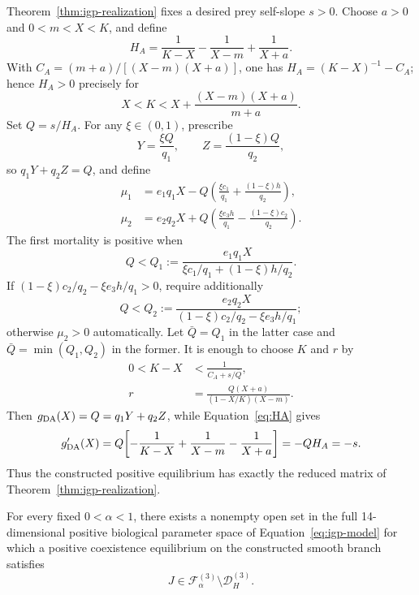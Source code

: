 Theorem~\ref{thm:igp-realization} fixes a desired prey self-slope \(s>0\). Choose \(a>0\) and \(0<m<X<K\), and define
\begin{equation}
 H_A
 =
 \frac{1}{K-X}-\frac{1}{X-m}+\frac{1}{X+a}.
 \label{eq:HA}
\end{equation}
With \(C_A=(m+a)/[(X-m)(X+a)]\), one has \(H_A=(K-X)^{-1}-C_A\); hence \(H_A>0\) precisely for
\[
 X<K<X+\frac{(X-m)(X+a)}{m+a}.
\]
Set \(Q=s/H_A\). For any \(\xi\in(0,1)\), prescribe
\[
 Y=\frac{\xi Q}{q_1},
 \qquad
 Z=\frac{(1-\xi)Q}{q_2},
\]
so \(q_1Y+q_2Z=Q\), and define
\begin{align}
 \mu_1&=e_1q_1X-Q\left(\frac{\xi c_1}{q_1}+\frac{(1-\xi)h}{q_2}\right),\\
 \mu_2&=e_2q_2X+Q\left(\frac{\xi e_3h}{q_1}-\frac{(1-\xi)c_2}{q_2}\right).
\end{align}
The first mortality is positive when
\[
 Q<Q_1:=
 \frac{e_1q_1X}
 {\xi c_1/q_1+(1-\xi)h/q_2}.
\]
If \((1-\xi)c_2/q_2-\xi e_3h/q_1>0\), require additionally
\[
 Q<Q_2:=
 \frac{e_2q_2X}
 {(1-\xi)c_2/q_2-\xi e_3h/q_1};
\]
otherwise \(\mu_2>0\) automatically. Let \(\bar Q=Q_1\) in the latter case and \(\bar Q=\min(Q_1,Q_2)\) in the former. It is enough to choose \(K\) and \(r\) by
\begin{align}
 0<K-X&<\frac{1}{C_A+s/\bar Q},\\
 r&=
 \frac{Q(X+a)}
 {(1-X/K)(X-m)}.
 \label{eq:r-embedding}
\end{align}
Then \(g_{\rm DA}(X)=Q=q_1Y+q_2Z\), while Equation~\eqref{eq:HA} gives
\[
 g_{\rm DA}'(X)
 =
 Q\left[-\frac1{K-X}+\frac1{X-m}-\frac1{X+a}\right]
 =-QH_A=-s.
\]
Thus the constructed positive equilibrium has exactly the reduced matrix of Theorem~\ref{thm:igp-realization}.

\begin{Theorem}\label{thm:open-ecological}
For every fixed \(0<\alpha<1\), there exists a nonempty open set in the full 14-dimensional positive biological parameter space of Equation~\eqref{eq:igp-model} for which a positive coexistence equilibrium on the constructed smooth branch satisfies
\begin{equation}
 J\in
 \mathcal F_\alpha^{(3)}
 \setminus
 \mathcal D_H^{(3)}.
 \label{eq:open-ecological-band}
\end{equation}
\end{Theorem}

